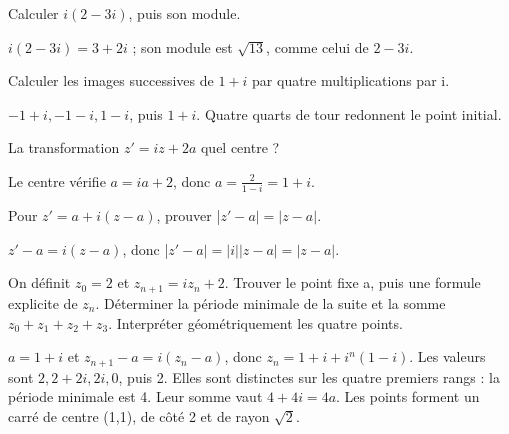 \documentclass[11pt]{article}
\begin{document}
Calculer \(i(2-3i)\), puis son module.\par
\(i(2-3i)=3+2i\) ; son module est \(\sqrt{13}\), comme celui de \(2-3i\).\par
{}
Calculer les images successives de \(1+i\) par quatre multiplications par i.\par
−\(1+i, -1-i, 1-i\), puis \(1+i\). Quatre quarts de tour redonnent le point initial.\par
{}
La transformation \(z'=i z+2 a\) quel centre ?\par
Le centre vérifie \(a=i a+2\), donc \(a=\frac{2}{1-i}=1+i\).\par
{}
Pour \(z'=a+i(z-a)\), prouver |\(z'-a|=|z-a|\).\par
\(z'-a=i(z-a)\), donc |\(z'-a|=|i||z-a|=|z-a|\).\par
{}
On définit \(z_{0}=2\) et \(z_{n+1}=i z_{n}+2\). Trouver le point fixe a, puis une formule explicite de \(z_{n}\). Déterminer la période minimale de la suite et la somme \(z_{0}+z_{1}+z_{2}+z_{3}\). Interpréter géométriquement les quatre points.\par
\(a=1+i\) et \(z_{n+1}-a=i(z_{n}-a)\), donc \(z_{n}=1+i+i^{n}(1-i)\). Les valeurs sont \(2, 2+2i, 2i, 0\), puis 2. Elles sont distinctes sur les quatre premiers rangs : la période minimale est 4. Leur somme vaut \(4+4i=4a\). Les points forment un carré de centre (1,1), de côté 2 et de rayon \(\sqrt{2}\).\par
\end{document}
